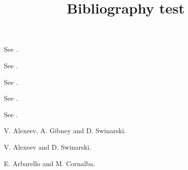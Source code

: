 \documentclass{amsart}
\title{Bibliography test}
\begin{document}
\maketitle

See \cite{AGS}.

See \cite{AGS,AS}.

See \cite{XXX}.

See \cite{AGS,AS,AC}.

See \cite[section 5]{AC}.

\begin{thebibliography}{GKM02}

 V. Alexeev, A. Gibney and D. Swinarski.  

 V. Alexeev and D. Swinarski. 

 E. Arbarello and M. Cornalba. 

\end{thebibliography}

\cite{AGS,AS,AC}
\end{document}

